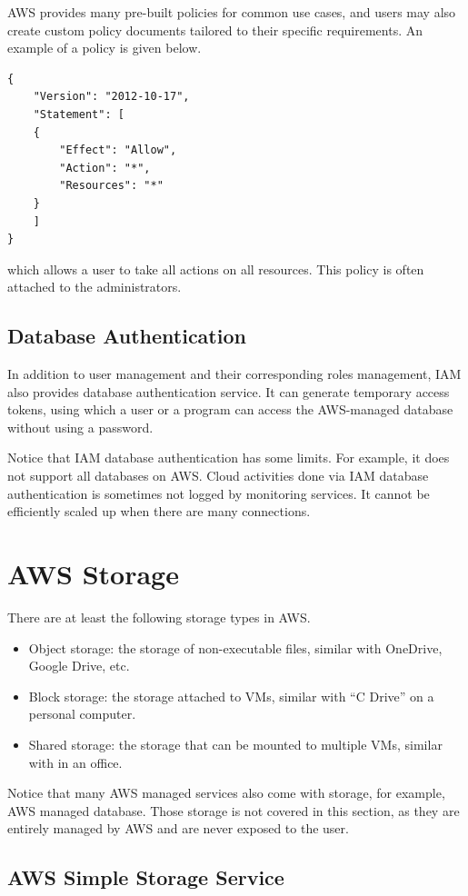 \begin{itemize}
	AWS provides many pre-built policies for common use cases, and users may also create custom policy documents tailored to their specific requirements. An example of a policy is given below.
	\begin{lstlisting}
{
	"Version": "2012-10-17",
	"Statement": [
	{
		"Effect": "Allow",
		"Action": "*",
		"Resources": "*"
	}
	]
}
	\end{lstlisting}
	which allows a user to take all actions on all resources. This policy is often attached to the administrators.
\end{itemize}

\subsection{Database Authentication}

In addition to user management and their corresponding roles management, IAM also provides database authentication service. It can generate temporary access tokens, using which a user or a program can access the AWS-managed database without using a password.

Notice that IAM database authentication has some limits. For example, it does not support all databases on AWS. Cloud activities done via IAM database authentication is sometimes not logged by monitoring services. It cannot be efficiently scaled up when there are many connections.

\section{AWS Storage}

There are at least the following storage types in AWS.
\begin{itemize}
	\item Object storage: the storage of non-executable files, similar with OneDrive, Google Drive, etc.
	\item Block storage: the storage attached to VMs, similar with ``C Drive'' on a personal computer.
	\item Shared storage: the storage that can be mounted to multiple VMs, similar with  in an office.
\end{itemize}
Notice that many AWS managed services also come with storage, for example, AWS managed database. Those storage is not covered in this section, as they are entirely managed by AWS and are never exposed to the user.

\subsection{AWS Simple Storage Service}

